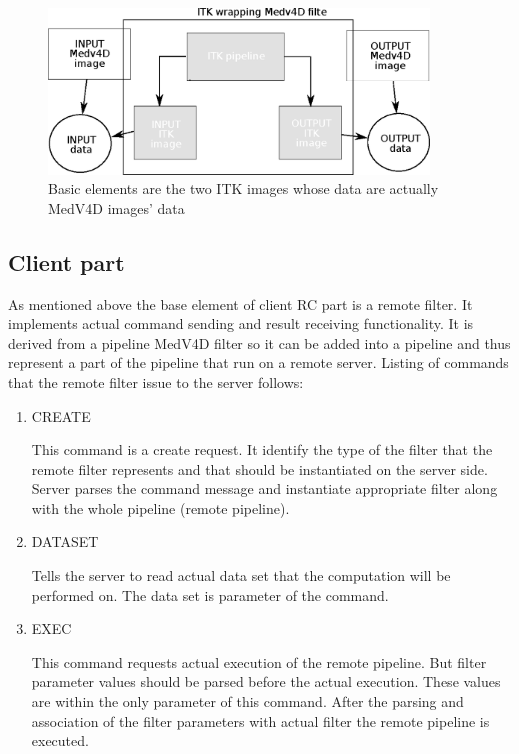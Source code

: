 \begin{figure}
    \centering
    \includegraphics[width=0.9\textwidth]{data/ITKFilter}
    \caption[ITK wrapper MedV4D filter]{Basic elements are the two ITK images whose data are actually MedV4D images' data}
    \label{fg:ITKWrapping}
\end{figure}

\subsection{Client part}

As mentioned above the base element of client RC part is a remote filter.
It implements actual command sending and result receiving functionality.
It is derived from a pipeline MedV4D filter so it can be added into a pipeline and thus represent a part of the pipeline that run on a remote server.
Listing of commands that the remote filter issue to the server follows:
\begin{enumerate}
  \item{CREATE}
  \par
  This command is a create request.
It identify the type of the filter that the remote filter represents and that should be instantiated on the server side.
Server parses the command message and instantiate appropriate filter along with the whole pipeline (remote pipeline).

  \item{DATASET}
  \par
  Tells the server to read actual data set that the computation will be performed on.
The data set is parameter of the command.

  \item{EXEC}
\par
  This command requests actual execution of the remote pipeline.
But filter parameter values should be parsed before the actual execution.
These values are within the only parameter of this command.
After the parsing and association of the filter parameters with actual filter the remote pipeline is executed.
\end{enumerate}

